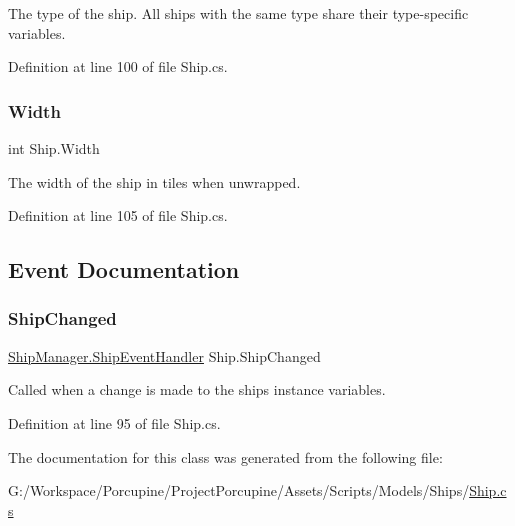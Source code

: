 The type of the ship. All ships with the same type share their type-\/specific variables. 



Definition at line 100 of file Ship.\+cs.

\mbox{\label{class_ship_a6c39fc4957664fabe750c64c057e2508}} 
\subsubsection{\texorpdfstring{Width}{Width}}
{\footnotesize\ttfamily int Ship.\+Width\hspace{0.3cm}{\ttfamily [get]}}



The width of the ship in tiles when unwrapped. 



Definition at line 105 of file Ship.\+cs.



\subsection{Event Documentation}
\mbox{\label{class_ship_a007fdacf563e7678e489bb8c0fc82a65}} 
\subsubsection{\texorpdfstring{Ship\+Changed}{ShipChanged}}
{\footnotesize\ttfamily \hyperlink{class_ship_manager_a9dbbc387497ab2f4fc7c90cde65dfd4d}{Ship\+Manager.\+Ship\+Event\+Handler} Ship.\+Ship\+Changed}



Called when a change is made to the ship\textquotesingle{}s instance variables. 



Definition at line 95 of file Ship.\+cs.



The documentation for this class was generated from the following file\+:\begin{DoxyCompactItemize}
\item 
G\+:/\+Workspace/\+Porcupine/\+Project\+Porcupine/\+Assets/\+Scripts/\+Models/\+Ships/\hyperlink{_ship_8cs}{Ship.\+cs}\end{DoxyCompactItemize}
